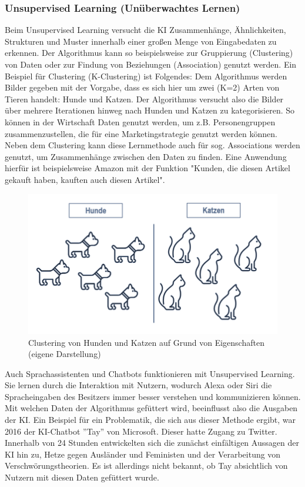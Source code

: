 \documentclass[a4paper,12pt, german]{report}
\begin{document}
\subsubsection{Unsupervised Learning (Unüberwachtes Lernen)} 

Beim Unsupervised Learning versucht die KI Zusammenhänge, Ähnlichkeiten, Strukturen und Muster innerhalb einer großen Menge von Eingabedaten zu erkennen. Der Algorithmus kann so beispielsweise zur Gruppierung (Clustering) von Daten oder zur Findung von Beziehungen (Association) genutzt werden.\newline
Ein Beispiel für Clustering (K-Clustering) ist Folgendes: Dem Algorithmus werden Bilder gegeben mit der Vorgabe, dass es sich hier um zwei (K=2) Arten von Tieren handelt: Hunde und Katzen. Der Algorithmus versucht also die Bilder über mehrere Iterationen hinweg nach Hunden und Katzen zu kategorisieren. So können in der Wirtschaft Daten genutzt werden, um z.B. Personengruppen zusammenzustellen, die für eine Marketingstrategie genutzt werden können. \newline
Neben dem Clustering kann diese Lernmethode auch für sog. Associations werden genutzt, um Zusammenhänge zwischen den Daten zu finden. Eine Anwendung hierfür ist beispielsweise Amazon mit der Funktion "Kunden, die diesen Artikel gekauft haben, kauften auch diesen Artikel". \cite{01} 
\begin{figure}[H]
  \center
  \includegraphics[width=12cm]{images/unsupervised.png}
  \caption[Clustering von Hunden und Katzen auf Grund von Eigenschaften]{Clustering von Hunden und Katzen auf Grund von Eigenschaften (eigene Darstellung)}
\end{figure}

Auch Sprachassistenten und Chatbots funktionieren mit Unsupervised Learning. Sie lernen durch die Interaktion mit Nutzern, wodurch Alexa oder Siri die Spracheingaben des Besitzers immer besser verstehen und kommunizieren können. Mit welchen Daten der Algorithmus gefüttert wird, beeinflusst also die Ausgaben der KI. Ein Beispiel für ein Problematik, die sich aus dieser Methode ergibt, war 2016 der KI-Chatbot ''Tay'' von Microsoft. Dieser hatte Zugang zu Twitter. Innerhalb von 24 Stunden entwickelten sich die zunächst einfältigen Aussagen der KI hin zu, Hetze gegen Ausländer und Feministen und der Verarbeitung von Verschwörungstheorien. Es ist allerdings nicht bekannt, ob Tay absichtlich von Nutzern mit diesen Daten gefüttert wurde.\cite{13}
\end{document}
